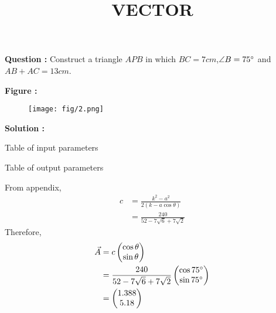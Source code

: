 \documentclass[12pt]{article}
\providecommand{\brak}[1]{\ensuremath{\left(#1\right)}}
\begin{document}
\title{\textbf{VECTOR}}
\date{}
\maketitle
\textbf{Question :} Construct a triangle $APB$ in which $BC = 7cm$,$\angle B = 75\degree$ and $AB+AC = 13cm$.

\textbf{Figure :}
\begin{figure}[H]
    \centering
          \texttt{[image: fig/2.png]}
    \caption{}
    \label{fig:fig:1}
\end{figure}

\textbf{Solution :}
\begin{table}[H]
    \centering
    
    \caption{Table of input parameters}
    \label{tab:tab:1}
\end{table} 
\begin{table}[H]
    \centering
    
  \caption{Table of output parameters}
    \label{tab:tab:2}
\end{table}


From appendix,
\begin{align}
    c&=\frac{k^2-a^2}{2\brak{k-a\cos{\theta}}}\\
    &=\frac{240}{52-7\sqrt{6}+7\sqrt{2}}
    \end{align}
Therefore,
\begin{align}
    \Vec{A}&=c\begin{pmatrix}
        \cos{\theta}\\\sin{\theta}
    \end{pmatrix}\\
    &=\frac{240}{52-7\sqrt{6}+7\sqrt{2}}\begin{pmatrix}
        \cos{75\degree}\\\sin{75\degree}
    \end{pmatrix}\\
    &=\begin{pmatrix}
        1.388\\5.18
    \end{pmatrix}\\
\end{align}
\end{document}
